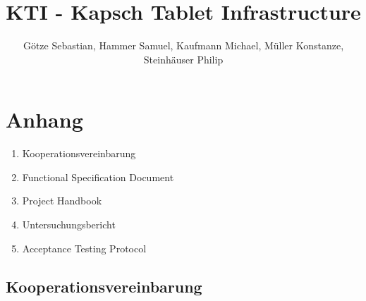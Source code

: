 \documentclass[diplom,german]{hgbthesis}
\begin{document}
\title{KTI - Kapsch Tablet Infrastructure}
\author{Götze Sebastian, Hammer Samuel, Kaufmann Michael, Müller Konstanze, Steinhäuser 				Philip}



\frontmatter


\newpage

\setcounter{tocdepth}{5}
\setcounter{secnumdepth}{5}
\tableofcontents

\mainmatter
\setcounter{page}{1}











\MakeBibliography

%
\listoffigures
{}

%
\listoftables
{}




\chapter{Anhang}
\begin{enumerate}
	\item Kooperationsvereinbarung
	\item Functional Specification Document
	\item Project Handbook
	\item Untersuchungsbericht
	\item Acceptance Testing Protocol
\end{enumerate}

\newpage

\section{Kooperationsvereinbarung}

\newpage
\end{document}
